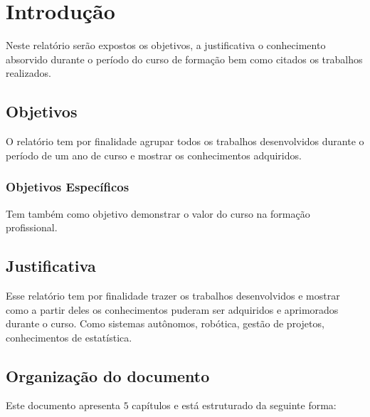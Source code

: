 \chapter{Introdução}
\label{chap:intro}

Neste relatório serão expostos os objetivos, a justificativa  o conhecimento absorvido durante o período do curso de formação bem como citados os trabalhos realizados.

\section{Objetivos}
\label{sec:obj}

O relatório tem por finalidade agrupar todos os trabalhos desenvolvidos durante o período de um ano de curso e mostrar os conhecimentos adquiridos.


\subsection{Objetivos Específicos}
\label{ssec:objesp}

Tem também como objetivo demonstrar o valor do curso na formação profissional.



\section{Justificativa}
\label{sec:justi}

Esse relatório tem por finalidade trazer os trabalhos desenvolvidos e mostrar como a partir deles os conhecimentos puderam ser adquiridos e aprimorados durante o curso. Como sistemas autônomos, robótica, gestão de projetos, conhecimentos de estatística.  





\section{Organização do documento}
\label{section:organizacao}

Este documento apresenta $5$ capítulos e está estruturado da seguinte forma:

